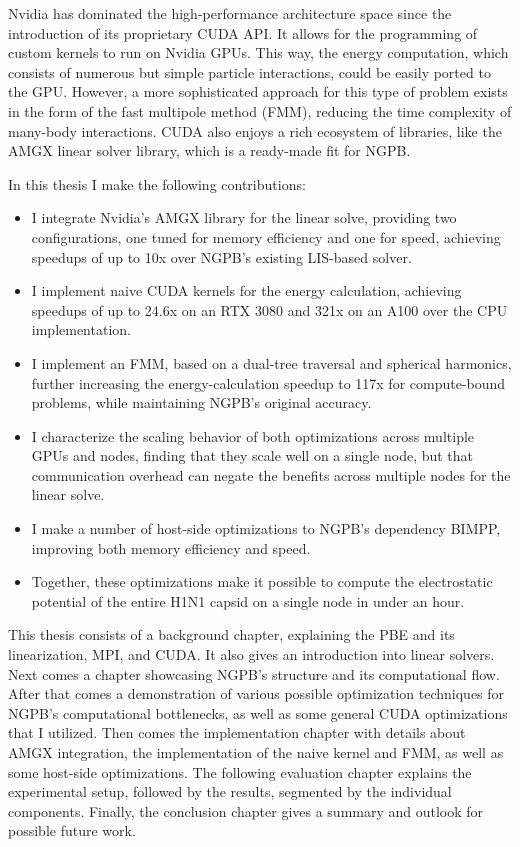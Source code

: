 Nvidia has dominated the high-performance architecture space since the introduction of its proprietary CUDA API.
It allows for the programming of custom kernels to run on Nvidia GPUs.
This way, the energy computation, which consists of numerous but simple particle interactions, could be easily ported to the GPU.
However, a more sophisticated approach for this type of problem exists in the form of the fast multipole method (FMM), reducing the time complexity of many-body interactions.
CUDA also enjoys a rich ecosystem of libraries, like the AMGX linear solver library, which is a ready-made fit for NGPB.

In this thesis I make the following contributions:
\begin{itemize}
    \item I integrate Nvidia's AMGX library for the linear solve, providing two configurations, one tuned for memory efficiency and one for speed, achieving speedups of up to 10x over NGPB's existing LIS-based solver.
    \item I implement naive CUDA kernels for the energy calculation, achieving speedups of up to 24.6x on an RTX 3080 and 321x on an A100 over the CPU implementation.
    \item I implement an FMM, based on a dual-tree traversal and spherical harmonics, further increasing the energy-calculation speedup to 117x for compute-bound problems, while maintaining NGPB's original accuracy.
    \item I characterize the scaling behavior of both optimizations across multiple GPUs and nodes, finding that they scale well on a single node, but that communication overhead can negate the benefits across multiple nodes for the linear solve.
    \item I make a number of host-side optimizations to NGPB's dependency BIMPP, improving both memory efficiency and speed.
    \item Together, these optimizations make it possible to compute the electrostatic potential of the entire H1N1 capsid on a single node in under an hour.
\end{itemize}

This thesis consists of a background chapter, explaining the PBE and its linearization, MPI, and CUDA.
It also gives an introduction into linear solvers.
Next comes a chapter showcasing NGPB's structure and its computational flow.
After that comes a demonstration of various possible optimization techniques for NGPB's computational bottlenecks, as well as some general CUDA optimizations that I utilized.
Then comes the implementation chapter with details about AMGX integration, the implementation of the naive kernel and FMM, as well as some host-side optimizations.
The following evaluation chapter explains the experimental setup, followed by the results, segmented by the individual components.
Finally, the conclusion chapter gives a summary and outlook for possible future work.